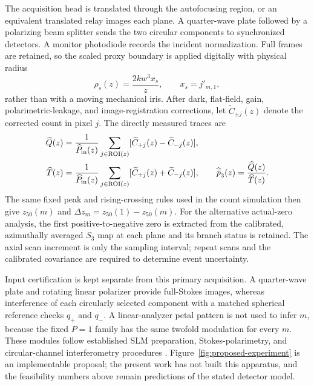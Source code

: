 The acquisition head is translated through the autofocusing region, or an
equivalent translated relay images each plane. A quarter-wave plate followed
by a polarizing beam splitter sends the two circular components to synchronized
detectors. A monitor photodiode records the incident normalization. Full frames
are retained, so the scaled proxy boundary is applied digitally with physical
radius
\begin{equation}
 \rho_s(z)=\frac{2kw^3x_s}{z},\qquad x_s=j'_{m,1},
\end{equation}
rather than with a moving mechanical iris. After dark, flat-field, gain,
polarimetric-leakage, and image-registration corrections, let
$\widetilde C_{\pm j}(z)$ denote the corrected count in pixel $j$. The directly
measured traces are
\begin{align}
 \widehat Q(z)&=\frac{1}{\widehat P_{\rm in}(z)}
  \sum_{j\in{\rm ROI}(z)}[\widetilde C_{+j}(z)-\widetilde C_{-j}(z)],\\
 \widehat T(z)&=\frac{1}{\widehat P_{\rm in}(z)}
  \sum_{j\in{\rm ROI}(z)}[\widetilde C_{+j}(z)+\widetilde C_{-j}(z)],
 \qquad
 \widehat{\bar p}_3(z)=\frac{\widehat Q(z)}{\widehat T(z)}.
\end{align}
The same fixed peak and rising-crossing rules used in the count simulation
then give $z_{50}(m)$ and $\Delta z_m=z_{50}(1)-z_{50}(m)$. For the alternative
actual-zero analysis, the first positive-to-negative zero is extracted from
the calibrated, azimuthally averaged $S_3$ map at each plane and its branch
status is retained. The axial scan increment is only the sampling interval;
repeat scans and the calibrated covariance are required to determine event
uncertainty.

Input certification is kept separate from this primary acquisition. A
quarter-wave plate and rotating linear polarizer provide full-Stokes images,
whereas interference of each circularly selected component with a matched
spherical reference checks $q_+$ and $q_-$. A linear-analyzer petal pattern is
not used to infer $m$, because the fixed $P=1$ family has the same twofold
modulation for every $m$. These modules follow established SLM preparation,
Stokes-polarimetry, and circular-channel interferometry procedures
\cite{Liu2021,Yan2025,Zhu2025}. Figure~\ref{fig:proposed-experiment} is an
implementable proposal; the present work has not built this apparatus, and the
feasibility numbers above remain predictions of the stated detector model.

